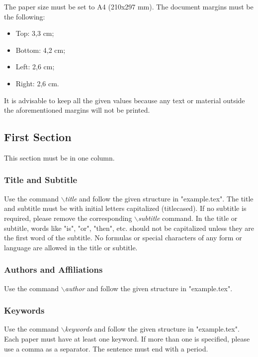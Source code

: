 \documentclass[a4paper,twoside]{article}
\begin{document}
The paper size must be set to A4 (210x297 mm). The document
margins must be the following:

\begin{itemize}
    \item Top: 3,3 cm;
    \item Bottom: 4,2 cm;
    \item Left: 2,6 cm;
    \item Right: 2,6 cm.
\end{itemize}

It is advisable to keep all the given values because any text or
material outside the aforementioned margins will not be printed.

\subsection{First Section}

This section must be in one column.

\vfill
\subsubsection{Title and Subtitle}

Use the command \textit{$\backslash$title} and follow the given structure in "example.tex". The title and subtitle must be with initial letters
capitalized (titlecased). If no subtitle is required, please remove the corresponding \textit{$\backslash$subtitle} command. In the title or subtitle, words like "is", "or", "then", etc. should not be capitalized unless they are the first word of the subtitle. No formulas or special characters of any form or language are allowed in the title or subtitle.

\subsubsection{Authors and Affiliations}

Use the command \textit{$\backslash$author} and follow the given structure in "example.tex".

\subsubsection{Keywords}

Use the command \textit{$\backslash$keywords} and follow the given structure in "example.tex". Each paper must have at least one keyword. If more than one is specified, please use a comma as a separator. The sentence must end with a period.
\end{document}

